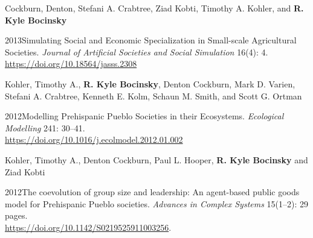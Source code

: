 Cockburn, Denton, Stefani A. Crabtree, Ziad Kobti, Timothy A. Kohler, and {\bf R. Kyle Bocinsky}
\begin{list1}
\item[] 2013\hspace{.2cm}Simulating Social and Economic Specialization in Small-scale Agricultural Societies. \emph{Journal of Artificial Societies and Social Simulation} 16(4): 4.\\\href{https://doi.org/10.18564/jasss.2308}{https://doi.org/10.18564/jasss.2308}
\end{list1}


Kohler, Timothy A., {\bf R. Kyle Bocinsky}, Denton Cockburn, Mark D. Varien, Stefani A. Crabtree, Kenneth E. Kolm, Schaun M. Smith, and Scott G. Ortman
\begin{list1}
\item[] 2012\hspace{.2cm}Modelling Prehispanic Pueblo Societies in their Ecosystems. \emph{Ecological Modelling} 241: 30–41.\\\href{https://doi.org/10.1016/j.ecolmodel.2012.01.002}{https://doi.org/10.1016/j.ecolmodel.2012.01.002}
\end{list1}


Kohler, Timothy A., Denton Cockburn, Paul L. Hooper, {\bf R. Kyle Bocinsky} and Ziad Kobti
\begin{list1}
\item[] 2012\hspace{.2cm}The coevolution of group size and leadership: An agent-based public goods model for Prehispanic Pueblo societies. \emph{Advances in
    Complex Systems} 15(1–2): 29 pages.\\\href{https://doi.org/10.1142/S0219525911003256}{https://doi.org/10.1142/S0219525911003256}.
\end{list1}
